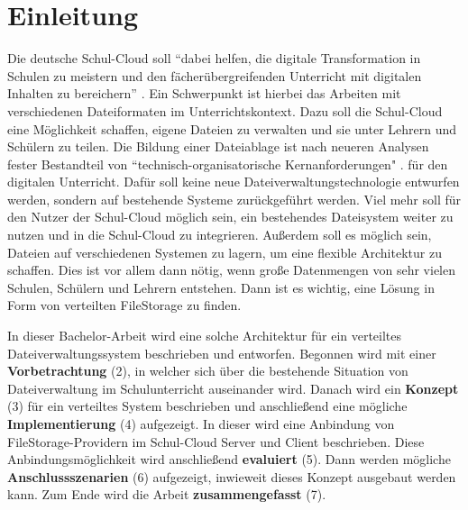 \section{Einleitung}
\label{sec:intro}

Die deutsche Schul-Cloud soll ``dabei helfen, die digitale Transformation in Schulen zu meistern und den fächerübergreifenden Unterricht mit digitalen Inhalten zu bereichern'' \cite{paper:technischerbericht}. Ein Schwerpunkt ist hierbei das Arbeiten mit verschiedenen Dateiformaten im Unterrichtskontext. Dazu soll die Schul-Cloud eine Möglichkeit schaffen, eigene Dateien zu verwalten und sie unter Lehrern und Schülern zu teilen. Die Bildung einer Dateiablage ist nach neueren Analysen fester Bestandteil von ``technisch-organisatorische Kernanforderungen" \cite{paper:breiterstolpmannzeising2015}. für den digitalen Unterricht. Dafür soll keine neue Dateiverwaltungstechnologie entwurfen werden, sondern auf bestehende Systeme zurückgeführt werden. Viel mehr soll für den Nutzer der Schul-Cloud möglich sein, ein bestehendes Dateisystem weiter zu nutzen und in die Schul-Cloud zu integrieren. Außerdem soll es möglich sein, Dateien auf verschiedenen Systemen zu lagern, um eine flexible Architektur zu schaffen. Dies ist vor allem dann nötig, wenn große Datenmengen von sehr vielen Schulen, Schülern und Lehrern entstehen. Dann ist es wichtig, eine Lösung in Form von verteilten FileStorage zu finden. 

In dieser Bachelor-Arbeit wird eine solche Architektur für ein verteiltes Dateiverwaltungssystem beschrieben und entworfen. Begonnen wird mit einer \textbf{Vorbetrachtung} (2), in welcher sich über die bestehende Situation von Dateiverwaltung im Schulunterricht auseinander wird. Danach wird ein \textbf{Konzept} (3) für ein verteiltes System beschrieben und anschließend eine mögliche \textbf{Implementierung} (4)  aufgezeigt. In dieser wird eine Anbindung von FileStorage-Providern im Schul-Cloud Server und Client beschrieben. Diese Anbindungsmöglichkeit wird anschließend \textbf{evaluiert} (5). Dann werden mögliche \textbf{Anschlussszenarien} (6) aufgezeigt, inwieweit dieses Konzept ausgebaut werden kann. Zum Ende wird die Arbeit \textbf{zusammengefasst} (7).

\clearpage
